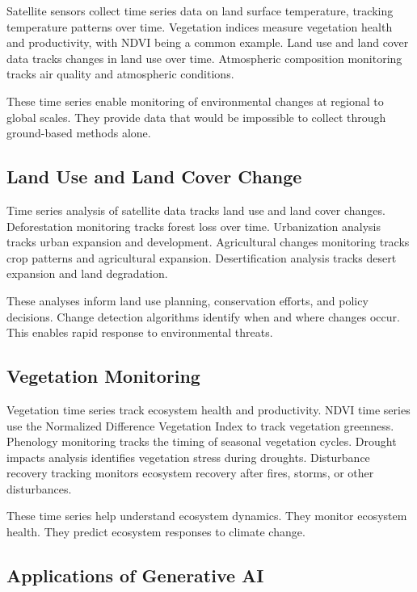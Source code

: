 Satellite sensors collect time series data on land surface temperature, tracking temperature patterns over time. Vegetation indices measure vegetation health and productivity, with NDVI being a common example. Land use and land cover data tracks changes in land use over time. Atmospheric composition monitoring tracks air quality and atmospheric conditions.

These time series enable monitoring of environmental changes at regional to global scales. They provide data that would be impossible to collect through ground-based methods alone.

\subsection{Land Use and Land Cover Change}

Time series analysis of satellite data tracks land use and land cover changes. Deforestation monitoring tracks forest loss over time. Urbanization analysis tracks urban expansion and development. Agricultural changes monitoring tracks crop patterns and agricultural expansion. Desertification analysis tracks desert expansion and land degradation.

These analyses inform land use planning, conservation efforts, and policy decisions. Change detection algorithms identify when and where changes occur. This enables rapid response to environmental threats.

\subsection{Vegetation Monitoring}

Vegetation time series track ecosystem health and productivity. NDVI time series use the Normalized Difference Vegetation Index to track vegetation greenness. Phenology monitoring tracks the timing of seasonal vegetation cycles. Drought impacts analysis identifies vegetation stress during droughts. Disturbance recovery tracking monitors ecosystem recovery after fires, storms, or other disturbances.

These time series help understand ecosystem dynamics. They monitor ecosystem health. They predict ecosystem responses to climate change.

\subsection{Applications of Generative AI}

